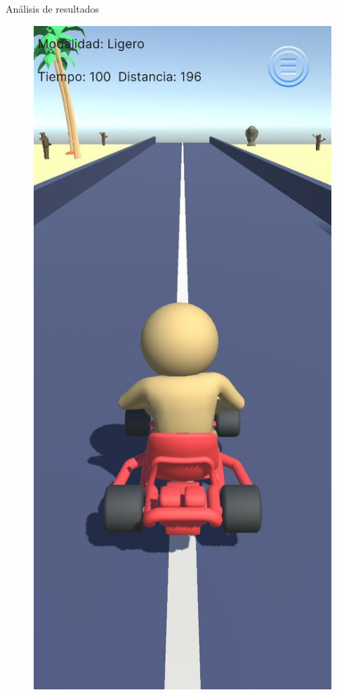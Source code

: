 \begin{thesischapter}{3} {Análisis de resultados}
    \vspace{10pt}
    \begin{figure}[ht]
        \centering
        \includegraphics[scale=0.17]{images/ui/7.jpg}

\end{figure}
\end{thesischapter}
